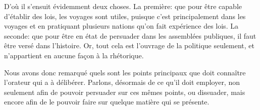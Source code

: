 D'où il s'ensuit évidemment deux choses. La première: que pour être capable d'établir des lois, les voyages sont utiles,
puisque c'est principalement dans les voyages et en pratiquant plusieurs nations qu'on fait expérience des lois. La seconde:
que pour être en état de persuader dans les assemblées publiques, il faut être versé dans l'histoire. Or, tout cela est
l'ouvrage de la politique seulement, et n'appartient en aucune façon à la rhétorique.

Nous avons donc remarqué quels sont les points principaux que doit connaître l'orateur qui a à délibérer. Parlons, désormais
de ce qu'il doit employer, non seulement afin de pouvoir persuader sur ces mêmes points, ou dissuader, mais encore afin de
le pouvoir faire sur quelque matière qui se présente.
